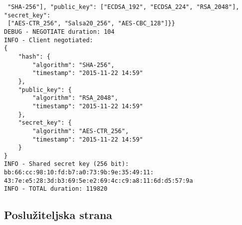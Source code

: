 \begin{subappendices}
\begin{small}
\begin{verbatim}
 "SHA-256"], "public_key": ["ECDSA_192", "ECDSA_224", "RSA_2048"], "secret_key":
 ["AES-CTR_256", "Salsa20_256", "AES-CBC_128"]}}
DEBUG - NEGOTIATE duration: 104
INFO - Client negotiated: 
{
    "hash": {
        "algorithm": "SHA-256",
        "timestamp": "2015-11-22 14:59"
    },
    "public_key": {
        "algorithm": "RSA_2048",
        "timestamp": "2015-11-22 14:59"
    },
    "secret_key": {
        "algorithm": "AES-CTR_256",
        "timestamp": "2015-11-22 14:59"
    }
}
INFO - Shared secret key (256 bit): bb:66:cc:98:10:fd:b7:a0:73:9b:9e:35:49:11:
43:7e:e5:28:3d:b3:69:5e:e2:69:4c:c9:a8:11:6d:d5:57:9a
INFO - TOTAL duration: 119820
\end{verbatim}
\end{small}

\subsection{Poslužiteljska strana} \label{app:serv_impl}


\end{subappendices}
